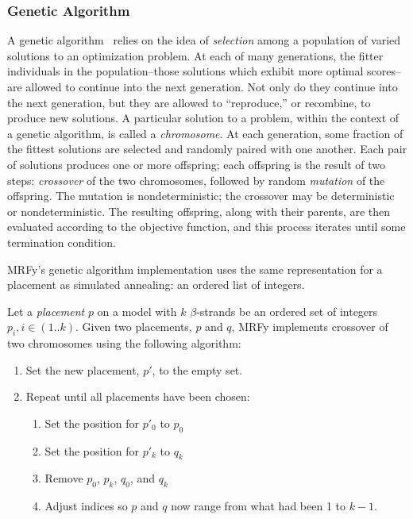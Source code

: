 \documentclass{acm_proc_article-sp}
\begin{document}
\subsubsection{Genetic Algorithm}

A genetic algorithm~\cite{Holland:1977hl} relies on the idea of 
\emph{selection} among a population of
varied solutions to an optimization problem.
At each of many generations, the fitter individuals in the population--those
solutions which exhibit more optimal scores--are allowed to continue into the
next generation.
Not only do they continue into the next generation, but they are allowed to
``reproduce,'' or recombine, to produce new solutions.
A particular solution to a problem, within the context of a genetic algorithm,
is called a \emph{chromosome}.
At each generation, some fraction of the fittest solutions are selected and
randomly paired with one another.
Each pair of solutions produces one or more offspring; each offspring is the
result of two steps: \emph{crossover} of the two chromosomes, followed by
random \emph{mutation} of the offspring.
The mutation is nondeterministic; the crossover may be deterministic or
nondeterministic.
The resulting offspring, along with their parents, are then evaluated according
to the objective function, and this process iterates until some termination
condition.


MRFy's genetic algorithm implementation uses the same representation for a
placement as simulated annealing: an ordered list of integers.

Let a \emph{placement} $p$ on a model with $k$ $\beta$-strands be an ordered 
set of integers $p_{i}, i \in (1..k)$.
Given two placements, $p$ and $q$, MRFy implements crossover of two chromosomes 
using the following algorithm:

\begin{enumerate}
  \item Set the new placement, $p'$, to the empty set.
  \item Repeat until all placements have been chosen:
  \begin{enumerate}
    \item Set the position for $p'_{0}$ to $p_{0}$
    \item Set the position for $p'_{k}$ to $q_{k}$
    \item Remove $p_{0}$, $p_{k}$, $q_{0}$, and $q_{k}$
    \item Adjust indices so $p$ and $q$ now range from what had been 1 to $k-1$.
  \end{enumerate}
\end{enumerate}
\end{document}
